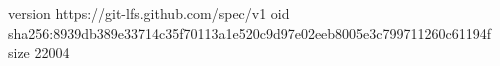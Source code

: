 version https://git-lfs.github.com/spec/v1
oid sha256:8939db389e33714c35f70113a1e520c9d97e02eeb8005e3c799711260c61194f
size 22004
